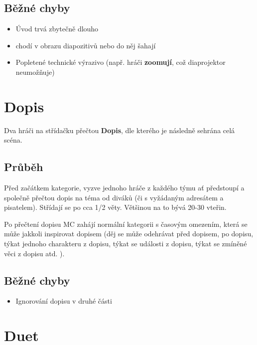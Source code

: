 \subsection{ Běžné chyby } \begin{itemize}
\item Úvod trvá zbytečně dlouho
\item {} chodí v obrazu diapozitivů nebo do něj šahají
\item Popletené technické výrazivo (např. hráči \textbf{zoomují}{}, což diaprojektor neumožňuje)
\end{itemize}
 
 
 
 
 
\needspace{5cm} \section{Dopis} \label{dopis}  
Dva hráči na střídačku přečtou \textbf{Dopis}{}, dle kterého je následně sehrána celá scéna. 
\subsection{Průběh} Před začátkem kategorie, vyzve  jednoho hráče z každého týmu ať předstoupí a společně přečtou dopis na téma od diváků (či s vyžádaným adresátem a pisatelem). 
Střídají se po cca 1/2 věty.  Většinou na to bývá 20-30 vteřin.  
 
Po přečtení dopisu MC zahájí normální kategorii s časovým omezením, která se může jakkoli inspirovat dopisem (děj se může odehrávat před dopisem, po dopisu, týkat jednoho charakteru z dopisu, týkat se události z dopisu, týkat se zmíněné věci z dopisu atd. ). 
\subsection{Běžné chyby} \begin{itemize}
\item Ignorování dopisu v druhé části
\end{itemize}
 
 
 
 
\needspace{5cm} \section{Duet} \label{duet}  
 
